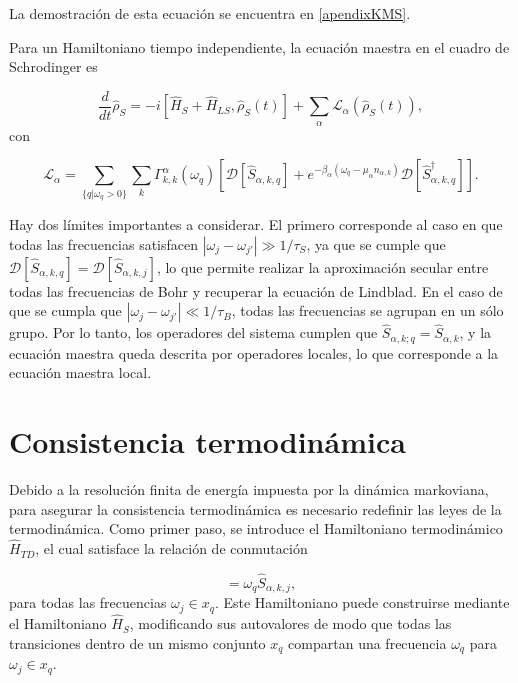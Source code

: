 La demostración de esta ecuación se encuentra en \ref{apendixKMS}.

Para un Hamiltoniano tiempo independiente, la ecuación maestra en el cuadro de Schrodinger es

\begin{equation}
    \frac{d}{dt}\hat{\rho}_{S} = -i [\hat{H}_{S}+ \hat{H}_{LS},\hat{\rho}_{S}(t)] + \sum_{\alpha}\mathcal{L}_{\alpha}(\hat{\rho}_{S}(t)),
\label{sec2schrodingerthermo}
\end{equation}
con

\begin{equation}
    \mathcal{L}_{\alpha} = \sum_{\{q|\omega_{q}>0\}} \sum_{k}\Gamma^{\alpha}_{k,k}(\omega_{q}) \left[ \mathcal{D}[\hat{S}_{\alpha,k,q}] + e^{-\beta_{\alpha}(\omega_{q} - \mu_{\alpha}n_{\alpha,k})}\mathcal{D}[\hat{S}^{\dagger}_{\alpha,k,q}]  \right].
\label{sec2lindbladconsistency}
\end{equation}

Hay dos límites importantes a considerar. El primero corresponde al caso en que todas las frecuencias satisfacen $|\omega_{j}-\omega_{j'}| \gg 1/\tau_{S}$, ya que se cumple que $\mathcal{D}[\hat{S}_{\alpha,k,q}] = \mathcal{D}[\hat{S}_{\alpha,k,j}]$, lo que permite realizar la aproximación secular entre todas las frecuencias de Bohr y recuperar la ecuación de Lindblad. En el caso de que se cumpla que $|\omega_{j}-\omega_{j'}| \ll 1/\tau_{B}$, todas las frecuencias se agrupan en un sólo grupo. Por lo tanto, los operadores del sistema cumplen que $\hat{S}_{\alpha,k;q} = \hat{S}_{\alpha,k}$, y la ecuación maestra queda descrita por operadores locales, lo que corresponde a la ecuación maestra local\cite{wichterich2007modeling}.
\section{Consistencia termodinámica}
Debido a la resolución finita de energía impuesta por la dinámica markoviana, para asegurar la consistencia termodinámica es necesario redefinir las leyes de la termodinámica. Como primer paso, se introduce el Hamiltoniano termodinámico $\hat{H}_{TD}$, el cual satisface la relación de conmutación

\begin{equation*}
    [\hat{S}_{\alpha,k,j},\hat{H}_{TD}] = \omega_{q}\hat{S}_{\alpha,k,j},
\end{equation*}
para todas las frecuencias $\omega_{j} \in x_{q}$. Este Hamiltoniano puede construirse mediante el Hamiltoniano $\hat{H}_{S}$, modificando sus autovalores de modo que todas las transiciones dentro de un mismo conjunto $x_q$ compartan una frecuencia $\omega_{q}$ para $\omega_{j} \in x_{q}$.

